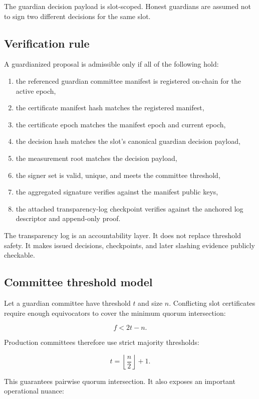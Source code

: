 \documentclass[11pt]{article}
\begin{document}
The guardian decision payload is slot-scoped. Honest guardians are assumed not
to sign two different decisions for the same slot.

\subsection{Verification rule}

A guardianized proposal is admissible only if all of the following hold:

\begin{enumerate}[leftmargin=1.5em]
\item the referenced guardian committee manifest is registered on-chain for the
active epoch,
\item the certificate manifest hash matches the registered manifest,
\item the certificate epoch matches the manifest epoch and current epoch,
\item the decision hash matches the slot's canonical guardian decision payload,
\item the measurement root matches the decision payload,
\item the signer set is valid, unique, and meets the committee threshold,
\item the aggregated signature verifies against the manifest public keys,
\item the attached transparency-log checkpoint verifies against the anchored
log descriptor and append-only proof.
\end{enumerate}

The transparency log is an accountability layer. It does not replace threshold
safety. It makes issued decisions, checkpoints, and later slashing evidence
publicly checkable.

\subsection{Committee threshold model}

Let a guardian committee have threshold \(t\) and size \(n\). Conflicting slot
certificates require enough equivocators to cover the minimum quorum
intersection:

\[
f < 2t - n.
\]

Production committees therefore use strict majority thresholds:

\[
t = \left\lfloor \frac{n}{2} \right\rfloor + 1.
\]

This guarantees pairwise quorum intersection. It also exposes an important
operational nuance:
\end{document}
